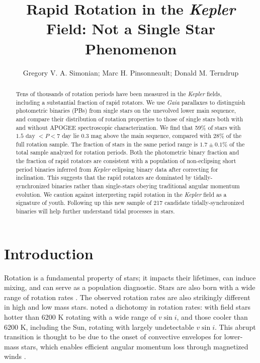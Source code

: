 \documentclass[twocolumn]{aastex6}
\newcommand{\vsini}{\ensuremath{v \sin i}}
\newcommand{\Kepler}{\mbox{\textit{Kepler}}}
\newcommand{\Gaia}{\mbox{\textit{Gaia}}}
\begin{document}
\title{Rapid Rotation in the \Kepler{} Field: Not a Single Star
Phenomenon}
\author{Gregory V. A. Simonian; Marc H. Pinsonneault; Donald M. Terndrup}

\begin{abstract}
    Tens of thousands of rotation periods have been measured in the
    \Kepler{} fields, including a substantial fraction of rapid rotators. We 
    use \Gaia{} parallaxes to distinguish photometric binaries (PBs) from
    single stars on the unevolved lower main sequence, and compare their
    distribution of rotation properties to those of single stars both with and 
    without APOGEE spectroscopic characterization. We find that 59\% of stars
    with \(1.5 \textrm{ day } < P < 7\) day lie 0.3 mag above the main
    sequence, compared with 28\% of the full rotation sample. The fraction of 
    stars in the same period range is \(1.7 \pm 0.1\%\) of the total sample 
    analyzed for rotation periods. Both the photometric binary fraction
    and the fraction of rapid rotators are consistent with a population of 
    non-eclipsing short period binaries inferred from \Kepler{} eclipsing 
    binary data after correcting for inclination. This suggests that the rapid rotators 
    are dominated by tidally-synchronized binaries rather than single-stars 
    obeying traditional angular momentum evolution. We caution against 
    interpreting rapid rotation in the \Kepler{} field as a signature of youth. 
    Following up this new sample of 217 candidate tidally-synchronized binaries 
    will help further understand tidal processes in stars.
\end{abstract}

\section{Introduction}

Rotation is a fundamental property of stars; it impacts their lifetimes, can
induce mixing, and can serve as a population diagnostic. Stars are also born 
with a wide range of rotation rates \citep{Attridge92, Herbst00, Henderson12}.
The observed rotation rates are also strikingly different in high and low mass 
stars. \citet{Kraft67} noted a dichotomy in rotation rates: with field stars 
hotter than 6200 K rotating with a wide range of \vsini, and those cooler than 
6200 K, including the Sun, rotating with largely undetectable \vsini. This abrupt transition is thought to
be due to the onset of convective envelopes for lower-mass stars, which 
enables efficient angular momentum loss through magnetized winds 
\citep{Parker58,Weber67}.
\end{document}
